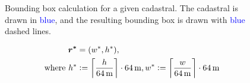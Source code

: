 \begin{figure}[H]
  \centering
  
  \caption{
    Bounding box calculation for a given cadastral.
    The cadastral is drawn in \textcolor{blue}{blue},
    and the resulting bounding box is drawn with \textcolor{blue}{blue} dashed lines.
  }
  \label{fig:cadastral_bbox}
\end{figure}

\begin{align*}
  \boldsymbol{r^*} &= (w^*, h^*),
  \\
  \text{ where }
  h^* &:= \left\lceil \frac{h}{\SI{64}{\meter}} \right\rceil \cdot \SI{64}{\meter},
  w^* := \left\lceil \frac{w}{\SI{64}{\meter}} \right\rceil \cdot \SI{64}{\meter}
\end{align*}

\begin{figure}[H]
  \centering
  
\end{figure}
